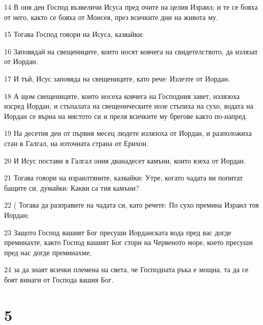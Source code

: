 \par 14 В оня ден Господ възвеличи Исуса пред очите на целия Израил; и те се бояха от него, както се бояха от Моисея, през всичките дни на живота му.
\par 15 Тогава Господ говори на Исуса, казвайки:
\par 16 Заповядай на свещениците, които носят ковчега на свидетелството, да излязат от Иордан.
\par 17 И тъй, Исус заповяда на свещениците, като рече: Излезте от Иордан.
\par 18 А щом свещениците, които носеха ковчега на Господния завет, излязоха изсред Иордан, и стъпалата на свещеническите нозе стъпиха на сухо, водата на Иордан се върна на мястото си и преля всичките му брегове както по-напред.
\par 19 На десетия ден от първия месец людете излязоха от Иордан, и разположиха стан в Галгал, на източната страна от Ерихон.
\par 20 И Исус постави в Галгал ония дванадесет камъни, които взеха от Иордан.
\par 21 Тогава говори на израилтяните, казвайки: Утре, когато чадата ви попитат бащите си, думайки: Какви са тия камъни?
\par 22 ( Тогава да разправите на чадата си, като речете: По сухо премина Израил тоя Иордан;
\par 23 Защото Господ вашият Бог пресуши Иорданската вода пред вас догде преминахте, както Господ вашият Бог стори на Червеното море, което пресуши пред нас догде преминахме,
\par 24 за да знаят всички племена на света, че Господната ръка е мощна, та да се боят винаги от Господа вашия Бог.

\chapter{5}

